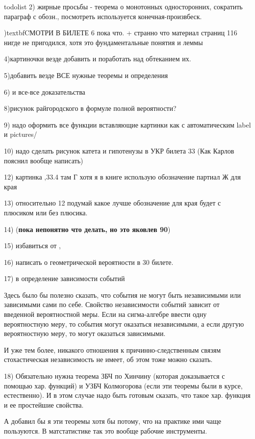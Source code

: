 todolist
2) жирные просьбы - теорема о монотонных односторонних, сократить параграф с обозн., посмотреть используется конечная-произвбеск.

\3)textbf{CМОТРИ В БИЛЕТЕ 6 пока что. + странно что материал страниц 116 нигде не пригодился, хотя это фундаментальные понятия и леммы}
 
4)картиночки везде добавить и поработать над обтеканием их.

5)добавить везде ВСЕ нужные теоремы и определения
 
6) и все-все доказательства
 
8)рисунок райгородского в формуле полной вероятности?
 
9) надо оформить все функции вставляющие картинки как \usepict с автоматическим label и pictures/
 
10) надо сделать рисунок катета и гипотенузы в УКР билета 33
(Как Карлов пояснил вообще написать)
 
12) картинка ,33.4 там Г хотя я в книге использую обозначение партиал Ж для края

13) относительно 12 подумай какое лучше обозначение для края будет с плюсиком или без плюсика. 


14) (\textbf{пока непонятно что делать, но это яковлев 90})

15) избавиться от \fa, \ex 

16) написать о геометрической вероятности в 30 билете.

17) в определение зависимости событий

Здесь было бы полезно сказать, что события не могут быть независимыми или зависимыми сами по себе. Свойство независимости событий зависит от введенной вероятностной меры. Если на сигма-алгебре ввести одну вероятностную меру, то события могут оказаться независимыми, а если другую вероятностную меру, то могут оказаться зависимыми.

И уже тем более, никакого отношения к причинно-следственным связям стохастическая независимость не имеет, об этом тоже можно сказать.

18) Обязательно нужна теорема ЗБЧ по Хинчину (которая доказывается с помощью хар. функций) и УЗБЧ Колмогорова (если эти теоремы были в курсе, естественно). И в этом случае надо быть готовым сказать, что такое хар. функция и ее простейшие свойства.

А добавил бы я эти теоремы хотя бы потому, что на практике ими чаще  пользуются. В матстатистике так это вообще рабочие инструменты.


